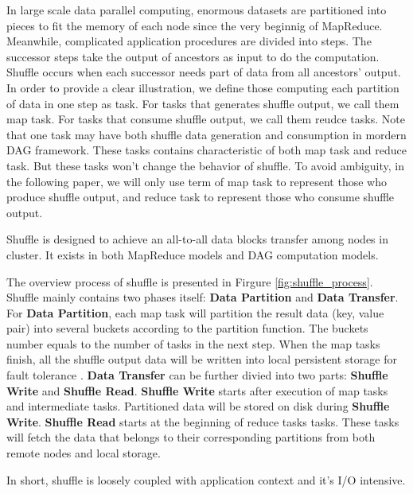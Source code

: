 \documentclass[10pt,twocolumn]{article}
\begin{document}
In large scale data parallel computing, enormous datasets are partitioned into pieces to fit the memory of each node since the very beginnig of MapReduce\cite{mapreduce}.
Meanwhile, complicated application procedures are divided into steps. The successor steps take the output of ancestors as input to do the computation. Shuffle occurs when each successor needs 
part of data from all ancestors' output. In order to provide a clear illustration, we define those computing each partition of data in one step as task. For tasks that generates shuffle output, we call
them map task. For tasks that consume shuffle output, we call them reudce tasks. Note that one task may have both shuffle data generation and consumption in mordern DAG framework. These tasks contains characteristic of both map task and reduce task. But these tasks won't change the behavior of shuffle. To avoid ambiguity, in the following paper, we will only use term of map task to represent those who produce shuffle output, and reduce task to represent those who consume shuffle output.

Shuffle is designed to achieve an all-to-all data blocks transfer among nodes in cluster. It exists in both MapReduce models and DAG computation models.

The overview process of shuffle is presented in Firgure \ref{fig:shuffle_process}. Shuffle mainly contains two phases itself: \textbf{Data Partition} and \textbf{Data Transfer}. For \textbf{Data Partition}, each map task will partition the result data (key, value pair) into several buckets according to the partition function.
The buckets number equals to the number of tasks in the next step. When the map tasks finish, all the shuffle output data will be written into local persistent storage for fault tolerance \cite{mapreduce, spark}.
\textbf{Data Transfer} can be further divied into two parts: \textbf{Shuffle Write} and \textbf{Shuffle Read}. \textbf{Shuffle Write} starts after execution of map tasks and intermediate tasks. Partitioned data will  be stored on disk during \textbf{Shuffle Write}. \textbf{Shuffle Read} starts at the beginning of reduce tasks tasks. These tasks will fetch the data that belongs to their corresponding partitions from both remote nodes and local storage.

In short, shuffle is loosely coupled with application context and it's I/O intensive.
\end{document}
